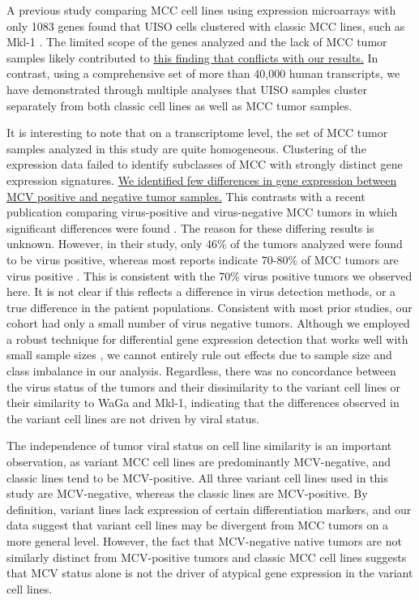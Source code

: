 \documentclass[10pt]{article}
\begin{document}
A previous study comparing MCC cell lines using expression microarrays with only 1083 genes found that UISO cells clustered with classic MCC lines, such as Mkl-1 \citep{VanGele2004Geneexpression}.
The limited scope of the genes analyzed and the lack of MCC tumor samples likely contributed to \uline{this finding that conflicts with our results.}
In contrast, using a comprehensive set of more than 40,000 human transcripts, we have demonstrated through multiple analyses that UISO samples cluster separately from both classic cell lines as well as MCC tumor samples.

It is interesting to note that on a transcriptome level, the set of MCC tumor samples analyzed in this study are quite homogeneous.
Clustering of the expression data failed to identify subclasses of MCC with strongly distinct gene expression signatures.
\uline{We identified few differences in gene expression between MCV positive and negative tumor samples.}
This contrasts with a recent publication comparing virus-positive and virus-negative MCC tumors in which significant differences were found \citep{Harms2013Distinct}.
The reason for these differing results is unknown.
However, in their study, only 46\% of the tumors analyzed were found to be virus positive, whereas most reports indicate 70-80\% of MCC tumors are virus positive \citep{Pulitzer2009Merkel,Feng2008Clonal}.
This is consistent with the 70\% virus positive tumors we observed here.
It is not clear if this reflects a difference in virus detection methods, or a true difference in the patient populations.
Consistent with most prior studies, our cohort had only a small number of virus negative tumors. 
Although we employed a robust technique for differential gene expression detection that works well with small sample sizes \citep{Smyth2004Linear,Smyth2005Limma}, we cannot entirely rule out effects due to sample size and class imbalance in our analysis.
Regardless, there was no concordance between the virus status of the tumors and their dissimilarity to the variant cell lines or their similarity to WaGa and Mkl-1, indicating that the differences observed in the variant cell lines are not driven by viral status.

The independence of tumor viral status on cell line similarity is an important observation, as variant MCC cell lines are predominantly MCV-negative, and classic lines tend to be MCV-positive. 
All three variant cell lines used in this study are MCV-negative, whereas the classic lines are MCV-positive.
By definition, variant lines lack expression of certain differentiation markers, and our data suggest that variant cell lines may be divergent from MCC tumors on a more general level. 
However, the fact that MCV-negative native tumors are not similarly distinct from MCV-positive tumors and classic MCC cell lines suggests that MCV status alone is not the driver of atypical gene expression in the variant cell lines.
\end{document}
